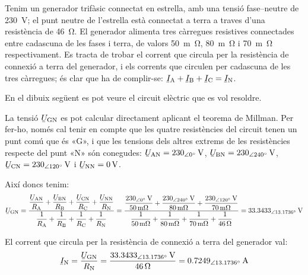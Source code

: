 \begin{exemple}
    Tenim un generador trifàsic connectat en estrella, amb una tensió fase--neutre de \SI{230}{V}; el punt neutre de l'estrella està connectat a terra a traves d'una resistència de \SI{46}{\ohm}. El generador alimenta tres càrregues resistives connectades entre cadascuna de les fases i terra, de valors \SI{50}{m\ohm}, \SI{80}{m\ohm} i \SI{70}{m\ohm} respectivament. Es tracta de trobar el corrent que circula per la resistència de connexió a terra del generador, i els corrents que circulen per cadascuna de les tres càrregues; és clar que ha de complir-se: $\cmplx{I}\ped{A} + \cmplx{I}\ped{B} + \cmplx{I}\ped{C} = \cmplx{I}\ped{N}$.

    En el dibuix següent es pot veure el circuit elèctric que es vol resoldre.

    \begin{center}
        
    \end{center}

    La tensió $\cmplx{U}\ped{GN}$ es pot calcular directament aplicant el teorema de Millman. Per fer-ho, només cal tenir en compte que les quatre resistències del circuit tenen un punt comú que és «G», i que les tensions dels altres extrems de les resistències respecte del punt «N» són conegudes: $\cmplx{U}\ped{AN}=\SIpd{230}{0}{V}$, $\cmplx{U}\ped{BN}=\SIpd{230}{240}{V}$, $\cmplx{U}\ped{CN}=\SIpd{230}{120}{V}$ i  $\cmplx{U}\ped{NN}=\SI{0}{V}$.

    Així doncs tenim:
    \[
    \cmplx{U}\ped{GN} = \frac{ \dfrac{\cmplx{U}\ped{AN}}{R\ped{A}} + \dfrac{\cmplx{U}\ped{BN}}{R\ped{B}} + \dfrac{\cmplx{U}\ped{CN}}{R\ped{C}} + \dfrac{\cmplx{U}\ped{NN}}{R\ped{N}}} { \dfrac{1}{R\ped{A}} + \dfrac{1}{R\ped{B}} + \dfrac{1}{R\ped{C}} + \dfrac{1}{R\ped{N}} } =
    \frac{\dfrac{\SIpd{230}{0}{V}}{\SI{50}{m\ohm}}+\dfrac{\SIpd{230}{240}{V}}{\SI{80}{m\ohm}}+
    \dfrac{\SIpd{230}{120}{V}}{\SI{70}{m\ohm}}}{\dfrac{1}{\SI{50}{m\ohm}}+\dfrac{1}{\SI{80}{m\ohm}}+
    \dfrac{1}{\SI{70}{m\ohm}}+\dfrac{1}{\SI{46}{\ohm}}} =
    \SIpd{33,3433}{13,1736}{V}
    \]

    El corrent  que circula per la resistència de connexió a terra del generador val:
    \[
    \cmplx{I}\ped{N} = \frac{\cmplx{U}\ped{GN}}{R\ped{N}} = \frac{\SIpd{33,3433}{13,1736}{V}}{\SI{46}{\ohm}}
    = \SIpd{0,7249}{13,1736}{A}
    \]


\end{exemple}
